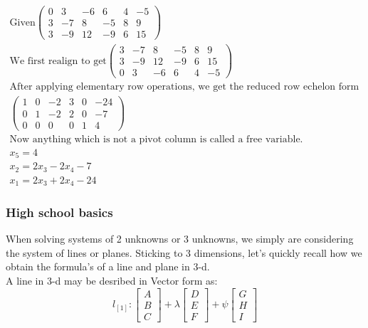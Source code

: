 \documentclass[titlepage]{article}
\numberwithin{equation}{subsection}
\begin{document}
\begin{tcolorbox}
    \begin{align*}
     \text{Given} \left(\begin{matrix}0&3&-6&6&4&-5\\3&-7&8&-5&8&9\\3&-9&12&-9&6&15\end{matrix}\right)\\
     \text{We first realign to get} \left(\begin{matrix}3&-7&8&-5&8&9\\3&-9&12&-9&6&15\\0&3&-6&6&4&-5\end{matrix}\right) \\
     \text{After applying elementary row operations, we get the reduced row echelon form of}\\
     \left(\begin{matrix}1&0&-2&3&0&-24\\0&1&-2&2&0&-7\\0&0&0&0&1&4\end{matrix}\right)\\ 
     \text{Now anything which is not a pivot column is called a free variable.}\\
     x_{5} = 4\\
     x_{2} = 2x_{3} - 2x_{4} - 7\\
     x_{1} = 2x_{3} + 2x_{4} - 24
     \end{align*}
\end{tcolorbox}

\subsubsection{High school basics}

When solving systems of 2 unknowns or 3 unknowns, we simply are considering the system of lines or planes. Sticking to 3 dimensions, let's quickly recall how we obtain the formula's of a line and plane in 3-d. 
\\
A line in 3-d may be desribed in Vector form as:
\begin{equation*}
    l_[1] : \begin{bmatrix}
        A\\
        B\\
        C
    \end{bmatrix}
    + 
    \lambda\begin{bmatrix}
        D\\
        E\\
        F
    \end{bmatrix}
    +
    \psi\begin{bmatrix}
        G\\
        H\\
        I
    \end{bmatrix}
\end{equation*}
\end{document}
